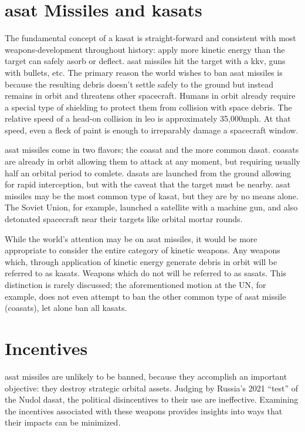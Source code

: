 \section*{\ac{asat} Missiles and \acfp{kasat}}

The fundamental concept of a \ac{kasat} is straight-forward and
consistent with most weapons-development throughout history: apply
more kinetic energy than the target can safely asorb or deflect.
\ac{asat} missiles hit the target with a \ac{kkv}, guns with bullets,
etc.  The primary reason the world wishes to ban \ac{asat} missiles is
because the resulting debris doesn't settle safely to the ground but
instead remains in orbit and threatens other spacecraft.  Humans in
orbit already require a special type of shielding to protect them from
collision with space debris.  The relative speed of a head-on
collision in \ac{leo} is approximately 35,000mph.  At that speed, even
a fleck of paint is enough to irreparably damage a spacecraft window.

\ac{asat} missiles come in two flavors; the \acf{coasat} and the more
common \acf{dasat}.  \acp{coasat} are already in orbit allowing them
to attack at any moment, but requiring usually half an orbital period
to comlete.  \acp{dasat} are launched from the ground allowing for
rapid interception, but with the caveat that the target must be
nearby.  \ac{asat} missiles may be the most common type of \ac{kasat},
but they are by no means alone.  The Soviet Union, for example,
launched a satellite with a machine gun, and also detonated spacecraft
near their targets like orbital mortar rounds.

While the world's attention may be on \ac{asat} missiles, it would be
more appropriate to consider the entire category of kinetic weapons.
Any weapons which, through application of kinetic energy generate
debris in orbit will be referred to as \acp{kasat}.  Weapons which do
not will be referred to as \acp{sasat}.  This distinction is rarely
discussed; the aforementioned motion at the UN, for example, does not
even attempt to ban the other common type of \ac{asat} missile
(\acp{coasat}), let alone ban all \acp{kasat}.  

\section*{Incentives}

\ac{asat} missiles are unlikely to be banned, because they accomplish
an important objective: they destroy strategic orbital assets.
Judging by Russia's 2021 ``test'' of the Nudol \ac{dasat}, the
political disincentives to their use are ineffective.  Examining the
incentives associated with these weapons provides insights into ways
that their impacts can be minimized.

